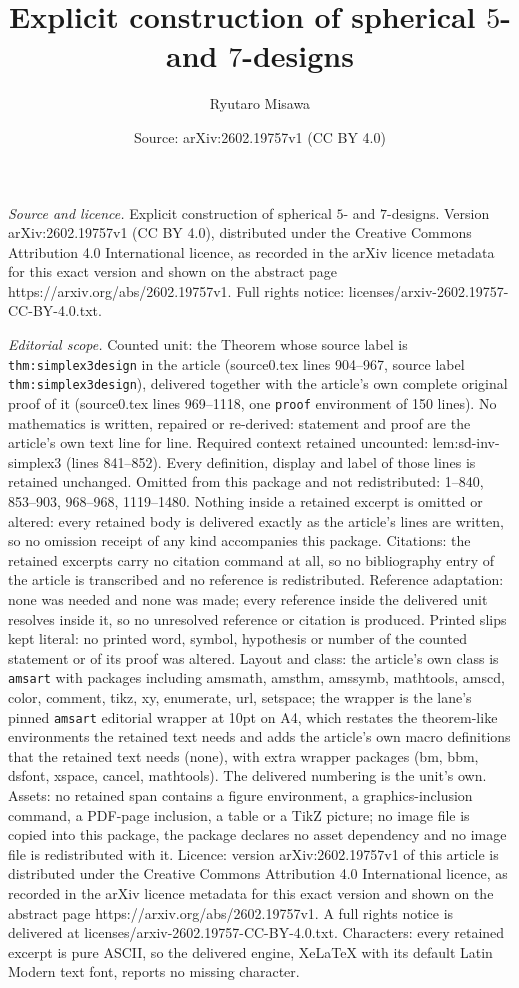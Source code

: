 \documentclass[10pt,a4paper]{amsart}
\title[Explicit construction of spherical $5$- and $7$-designs]{Explicit construction of spherical $5$- and $7$-designs}
\author{Ryutaro Misawa}
\date{Source: arXiv:2602.19757v1 (CC BY 4.0)}
\begin{document}
\maketitle

\noindent\emph{Source and licence.} Explicit construction of spherical $5$- and $7$-designs. Version arXiv:2602.19757v1 (CC BY 4.0), distributed under the Creative Commons Attribution 4.0 International licence, as recorded in the arXiv licence metadata for this exact version and shown on the abstract page https://arxiv.org/abs/2602.19757v1. Full rights notice: licenses/arxiv-2602.19757-CC-BY-4.0.txt.\par\smallskip

\noindent\textit{Editorial scope.} Counted unit: the Theorem whose source label is \texttt{thm:simplex3design} in the article (source0.tex lines 904--967, source label \texttt{thm:simplex3design}), delivered together with the article's own complete original proof of it (source0.tex lines 969--1118, one \texttt{proof} environment of 150 lines). No mathematics is written, repaired or re-derived: statement and proof are the article's own text line for line. Required context retained uncounted: lem:sd-inv-simplex3 (lines 841--852). Every definition, display and label of those lines is retained unchanged. Omitted from this package and not redistributed: 1--840, 853--903, 968--968, 1119--1480. Nothing inside a retained excerpt is omitted or altered: every retained body is delivered exactly as the article's lines are written, so no omission receipt of any kind accompanies this package. Citations: the retained excerpts carry no citation command at all, so no bibliography entry of the article is transcribed and no reference is redistributed. Reference adaptation: none was needed and none was made; every reference inside the delivered unit resolves inside it, so no unresolved reference or citation is produced. Printed slips kept literal: no printed word, symbol, hypothesis or number of the counted statement or of its proof was altered. Layout and class: the article's own class is \texttt{amsart} with packages including amsmath, amsthm, amssymb, mathtools, amscd, color, comment, tikz, xy, enumerate, url, setspace; the wrapper is the lane's pinned \texttt{amsart} editorial wrapper at 10pt on A4, which restates the theorem-like environments the retained text needs and adds the article's own macro definitions that the retained text needs (none), with extra wrapper packages (bm, bbm, dsfont, xspace, cancel, mathtools). The delivered numbering is the unit's own. Assets: no retained span contains a figure environment, a graphics-inclusion command, a PDF-page inclusion, a table or a TikZ picture; no image file is copied into this package, the package declares no asset dependency and no image file is redistributed with it. Licence: version arXiv:2602.19757v1 of this article is distributed under the Creative Commons Attribution 4.0 International licence, as recorded in the arXiv licence metadata for this exact version and shown on the abstract page https://arxiv.org/abs/2602.19757v1. A full rights notice is delivered at licenses/arxiv-2602.19757-CC-BY-4.0.txt. Characters: every retained excerpt is pure ASCII, so the delivered engine, XeLaTeX with its default Latin Modern text font, reports no missing character.
\end{document}
